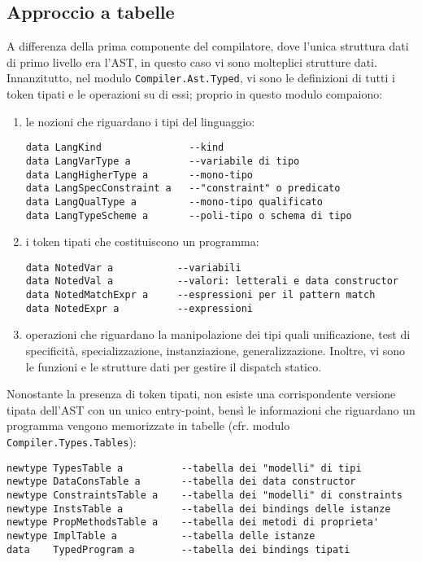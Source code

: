 \documentclass[10pt,a4paper]{article}
\begin{document}
\hypertarget{Approccio a tabelle}{\subsection{Approccio a tabelle}}
A differenza della prima componente del compilatore, dove l'unica struttura dati di primo livello era l'AST, in
questo caso vi sono molteplici strutture dati. Innanzitutto, nel modulo \texttt{Compiler.Ast.Typed},
vi sono le definizioni di tutti i token tipati e le operazioni su di essi; proprio in questo modulo compaiono:
\begin{enumerate}
    \item le nozioni che riguardano i tipi del linguaggio:
    \begin{lstlisting}
data LangKind               --kind
data LangVarType a          --variabile di tipo
data LangHigherType a       --mono-tipo
data LangSpecConstraint a   --"constraint" o predicato
data LangQualType a         --mono-tipo qualificato
data LangTypeScheme a       --poli-tipo o schema di tipo
    \end{lstlisting}
    \item i token tipati che costituiscono un programma:
    \begin{lstlisting}
data NotedVar a           --variabili
data NotedVal a           --valori: letterali e data constructor
data NotedMatchExpr a     --espressioni per il pattern match
data NotedExpr a          --expressioni
    \end{lstlisting}
    \item operazioni che riguardano la manipolazione dei tipi quali unificazione, test di specificità, specializzazione,
    instanziazione, generalizzazione. Inoltre, vi sono le funzioni e le strutture dati per gestire il dispatch statico.
\end{enumerate}
Nonostante la presenza di token tipati, non esiste una corrispondente versione tipata dell'AST con un unico entry-point,
bensì le informazioni che riguardano un programma vengono memorizzate in tabelle (cfr. modulo
\texttt{Compiler.Types.Tables}):
\begin{lstlisting}
newtype TypesTable a          --tabella dei "modelli" di tipi
newtype DataConsTable a       --tabella dei data constructor
newtype ConstraintsTable a    --tabella dei "modelli" di constraints
newtype InstsTable a          --tabella dei bindings delle istanze
newtype PropMethodsTable a    --tabella dei metodi di proprieta'
newtype ImplTable a           --tabella delle istanze
data    TypedProgram a        --tabella dei bindings tipati
\end{lstlisting}
\end{document}
